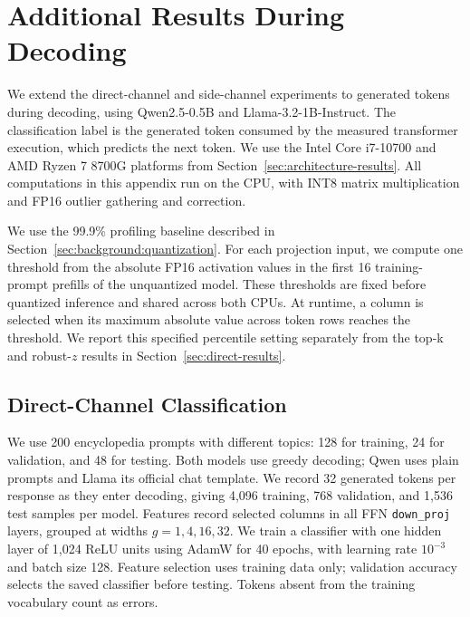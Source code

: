 \section{Additional Results During Decoding}
\label{sec:decoding-appendix}
\raggedbottom

We extend the direct-channel and side-channel experiments to generated tokens during decoding, using Qwen2.5-0.5B and Llama-3.2-1B-Instruct.
The classification label is the generated token consumed by the measured transformer execution, which predicts the next token.
We use the Intel Core i7-10700 and AMD Ryzen 7 8700G platforms from Section~\ref{sec:architecture-results}.
All computations in this appendix run on the CPU, with INT8 matrix multiplication and FP16 outlier gathering and correction.

We use the 99.9\% profiling baseline described in Section~\ref{sec:background:quantization}.
For each projection input, we compute one threshold from the absolute FP16 activation values in the first 16 training-prompt prefills of the unquantized model.
These thresholds are fixed before quantized inference and shared across both CPUs.
At runtime, a column is selected when its maximum absolute value across token rows reaches the threshold.
We report this specified percentile setting separately from the top-k and robust-$z$ results in Section~\ref{sec:direct-results}.

\subsection{Direct-Channel Classification}
\label{sec:decoding-direct}

We use 200 encyclopedia prompts with different topics: 128 for training, 24 for validation, and 48 for testing.
Both models use greedy decoding; Qwen uses plain prompts and Llama its official chat template.
We record 32 generated tokens per response as they enter decoding, giving 4,096 training, 768 validation, and 1,536 test samples per model.
Features record selected columns in all FFN \texttt{down\_proj} layers, grouped at widths $g=1,4,16,32$.
We train a classifier with one hidden layer of 1,024 ReLU units using AdamW for 40 epochs, with learning rate $10^{-3}$ and batch size 128.
Feature selection uses training data only; validation accuracy selects the saved classifier before testing.
Tokens absent from the training vocabulary count as errors.

